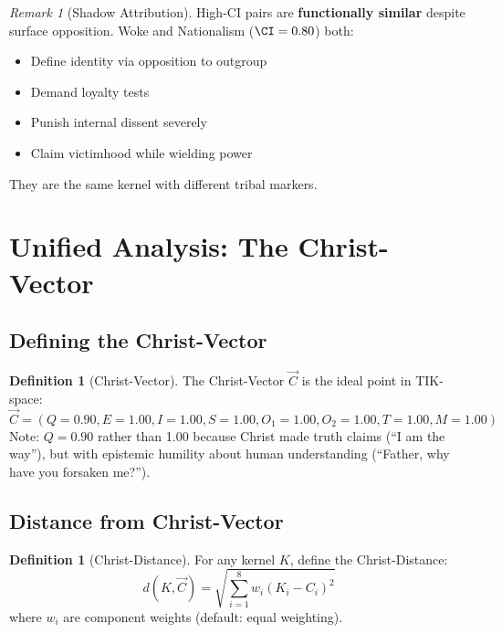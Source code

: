\documentclass[11pt,a4paper]{article}
\theoremstyle{definition}
\newtheorem{definition}[theorem]{Definition}
\theoremstyle{remark}
\newtheorem{remark}{Remark}
\begin{document}
\begin{remark}[Shadow Attribution]
High-CI pairs are \textbf{functionally similar} despite surface opposition. Woke and Nationalism ($\CI = 0.80$) both:
\begin{itemize}
    \item Define identity via opposition to outgroup
    \item Demand loyalty tests
    \item Punish internal dissent severely
    \item Claim victimhood while wielding power
\end{itemize}
They are the same kernel with different tribal markers.
\end{remark}

\newpage

\section{Unified Analysis: The Christ-Vector}

\subsection{Defining the Christ-Vector}

\begin{definition}[Christ-Vector]
\label{def:christ-vector}
The Christ-Vector $\vec{C}$ is the ideal point in TIK-space:
\begin{equation}
    \vec{C} = (Q=0.90, E=1.00, I=1.00, S=1.00, O_1=1.00, O_2=1.00, T=1.00, M=1.00)
    \label{eq:christ-vector}
\end{equation}
Note: $Q = 0.90$ rather than 1.00 because Christ made truth claims (``I am the way''), but with epistemic humility about human understanding (``Father, why have you forsaken me?'').
\end{definition}

\subsection{Distance from Christ-Vector}

\begin{definition}[Christ-Distance]
\label{def:christ-distance}
For any kernel $K$, define the Christ-Distance:
\begin{equation}
    d(K, \vec{C}) = \sqrt{\sum_{i=1}^{8} w_i (K_i - C_i)^2}
    \label{eq:christ-distance}
\end{equation}
where $w_i$ are component weights (default: equal weighting).
\end{definition}
\end{document}
